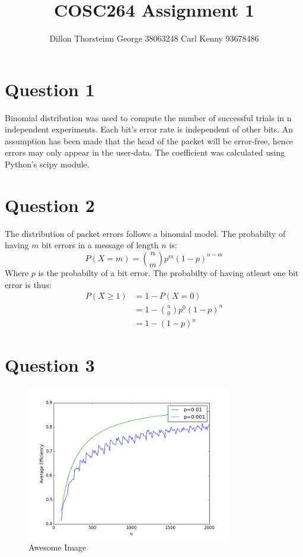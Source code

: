 \documentclass{article}
\title{COSC264 Assignment 1}
\author{Dillon Thorsteinn George 38063248 Carl Kenny 93678486}
\date{}
\begin{document}
\maketitle{}
\null  %
\nointerlineskip  %
\vfill
\let\snewpage \newpage
\let\newpage \relax
\let \newpage \snewpage
\vfill 
\break %

\newpage

\section*{Question 1}
Binomial distribution was used to compute the number of successful trials in n independent experiments.
Each bit's error rate is independent of other bits. An assumption has been made that the
head of the packet will be error-free, hence errors may only appear in the user-data. The
coefficient was calculated using Python's scipy module.

\section*{Question 2}
The distribution of packet errors follows a binomial model. The probabilty of having $m$
bit errors in a message of length $n$ is:
\[
        P(X=m) = {n\choose m} p^m (1-p)^{n-m}
\]
Where $p$ is the probabilty of a bit error.
The probabilty of having atleast one bit error is thus:
\begin{align*}
        P(X\geq 1) &= 1 - P(X = 0) \\
                   &= 1 - {n\choose 0} p^0 (1-p)^{n} \\
                   &= 1 - (1 - p)^{n}
\end{align*}

\section*{Question 3}
\begin{figure}[H]
    \centering
    \includegraphics[width=0.8\textwidth]{q3.png}
    \caption{Awesome Image}
    \label{fig:awesome_image}
\end{figure}
\end{document}
